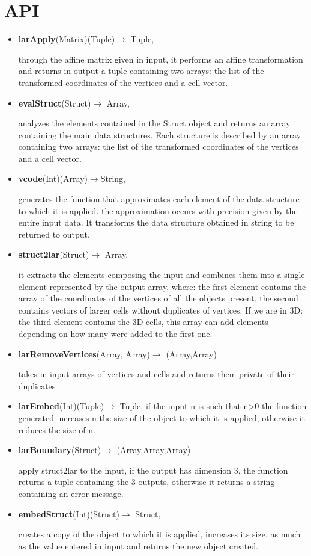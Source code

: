 \documentclass[a4paper,12pt]{article}
\begin{document}
\section{API}
\begin{itemize}
\item \textbf{larApply}(Matrix)(Tuple)$\rightarrow$ Tuple,

through the affine matrix given in input, it performs an affine transformation and returns in output a tuple containing two arrays: the list of the transformed coordinates of the vertices and a cell vector.
\item \textbf{evalStruct}(Struct)$\rightarrow$ Array,

analyzes the elements contained in the Struct object and returns an array containing the main data structures. Each structure is described by an array containing two arrays: the list of the transformed coordinates of the vertices and a cell vector.
\item  \textbf{vcode}(Int)(Array)$\rightarrow$String,

generates the function that approximates each element of the data structure to which it is applied. the approximation occurs with precision given by the entire input data. It transforms the data structure obtained in string to be returned to output.
\item \textbf{struct2lar}(Struct)$\rightarrow$ Array,

it extracts the elements composing the input and combines them into a single element represented by the output array, where: the first element contains the array of the coordinates of the vertices of all the objects present, the second contains vectors of larger cells without duplicates of vertices. If we are in 3D: the third element contains the 3D cells, this array can add elements depending on how many were added to the first one.
\item \textbf{larRemoveVertices}(Array, Array)$\rightarrow$ (Array,Array)

takes in input arrays of vertices and cells and returns them private of their duplicates
\item \textbf{larEmbed}(Int)(Tuple)$\rightarrow$ Tuple,
if the input n is such that n>0 the function generated increases n the size of the object to which it is applied, otherwise it reduces the size of n.
\item \textbf{larBoundary}(Struct)$\rightarrow$ (Array,Array,Array)

apply struct2lar to the input, if the output has dimension 3, the function returns a tuple containing the 3 outputs, otherwise it returns a string containing an error message.
\item \textbf{embedStruct}(Int)(Struct)$\rightarrow$ Struct,

creates a copy of the object to which it is applied, increases its size, as much as the value entered in input and returns the new object created.
\end{itemize}
\end{document}
